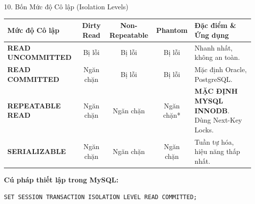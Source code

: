 \documentclass[aspectratio=169,11pt]{beamer}
\newcommand{\code}[1]{\texttt{#1}}
\begin{document}
\begin{frame}{10. Bốn Mức độ Cô lập (Isolation Levels)}
  \begin{table}
    \centering
    \scriptsize
    \begin{tabularx}{\textwidth}{l c c c X}
      \toprule
      \textbf{Mức độ Cô lập} & \textbf{Dirty Read} & \textbf{Non-Repeatable} & \textbf{Phantom} & \textbf{Đặc điểm \& Ứng dụng} \\
      \midrule
      \textbf{READ UNCOMMITTED} & \textcolor{dbred}{Bị lỗi} & \textcolor{dbred}{Bị lỗi} & \textcolor{dbred}{Bị lỗi} & Nhanh nhất, không an toàn. \\
      \textbf{READ COMMITTED} & \textcolor{dbgreen}{Ngăn chặn} & \textcolor{dbred}{Bị lỗi} & \textcolor{dbred}{Bị lỗi} & Mặc định Oracle, PostgreSQL. \\
      \textbf{REPEATABLE READ} & \textcolor{dbgreen}{Ngăn chặn} & \textcolor{dbgreen}{Ngăn chặn} & \textcolor{dbgreen}{Ngăn chặn*} & \textcolor{dbblue}{\textbf{MẶC ĐỊNH MYSQL INNODB}}. Dùng Next-Key Locks. \\
      \textbf{SERIALIZABLE} & \textcolor{dbgreen}{Ngăn chặn} & \textcolor{dbgreen}{Ngăn chặn} & \textcolor{dbgreen}{Ngăn chặn} & Tuần tự hóa, hiệu năng thấp nhất. \\
      \bottomrule
    \end{tabularx}
  \end{table}
  \vspace{0.4em}
  \textbf{Cú pháp thiết lập trong MySQL:}
  \begin{center}
    \code{SET SESSION TRANSACTION ISOLATION LEVEL READ COMMITTED;}
  \end{center}
\end{frame}
\end{document}
